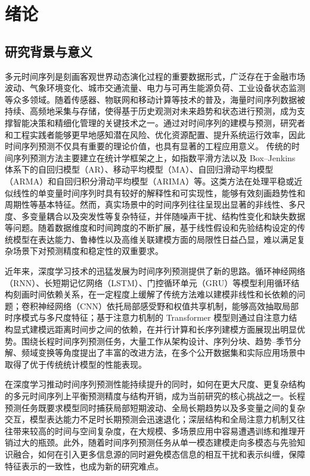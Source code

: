 \chapter{绪论} \section{研究背景与意义} 多元时间序列是刻画客观世界动态演化过程的重要数据形式，广泛存在于金融市场波动、气象环境变化、城市交通流量、电力与可再生能源负荷、工业设备状态监测等众多领域。随着传感器、物联网和移动计算等技术的普及，海量时间序列数据被持续、高频地采集与存储，使得基于历史观测对未来趋势和状态进行预测，成为支撑智能决策和精细化管理的关键技术之一。通过对时间序列的建模与预测，研究者和工程实践者能够更早地感知潜在风险、优化资源配置、提升系统运行效率，因此时间序列预测不仅具有重要的理论价值，也具有显著的工程应用意义\cite{lim2021deep,wen2023transformers}。
传统的时间序列预测方法主要建立在统计学框架之上，如指数平滑方法以及 Box--Jenkins 体系下的自回归模型（AR）、移动平均模型（MA）、自回归滑动平均模型（ARMA）和自回归积分滑动平均模型（ARIMA）等\cite{holt2004forecasting,box2015time}。这类方法在处理平稳或近似线性的单变量时间序列时具有较好的解释性和可实现性，能够有效刻画趋势性和周期性等基本特征。然而，真实场景中的时间序列往往呈现出显著的非线性、多尺度、多变量耦合以及突发性等复杂特征，并伴随噪声干扰、结构性变化和缺失数据等问题。随着数据维度和时间跨度的不断扩展，基于线性假设和先验结构设定的传统模型在表达能力、鲁棒性以及高维关联建模方面的局限性日益凸显，难以满足复杂场景下对预测精度和稳定性的双重要求。

近年来，深度学习技术的迅猛发展为时间序列预测提供了新的思路。循环神经网络（RNN）、长短期记忆网络（LSTM）、门控循环单元（GRU）等模型利用循环结构刻画时间依赖关系，在一定程度上缓解了传统方法难以建模非线性和长依赖的问题\cite{elman1990finding,hochreiter1997lstm}；卷积神经网络（CNN）依托局部感受野和权值共享机制，能够高效抽取局部时序模式与多尺度特征\cite{lecun1998gradient}；基于注意力机制的 Transformer 模型则通过自注意力结构显式建模远距离时间步之间的依赖，在并行计算和长序列建模方面展现出明显优势\cite{vaswani2017attention}。围绕长程时间序列预测任务，大量工作从架构设计、序列分块、趋势--季节分解、频域变换等角度提出了丰富的改进方法，在多个公开数据集和实际应用场景中取得了优于传统统计模型的性能表现\cite{zhou2021informer,wu2021autoformer}。

在深度学习推动时间序列预测性能持续提升的同时，如何在更大尺度、更复杂结构的多元时间序列上平衡预测精度与结构开销，成为当前研究的核心挑战之一。长程预测任务既要求模型同时捕获局部短期波动、全局长期趋势以及多变量之间的复杂交互，模型表达能力不足时长期预测会迅速退化；深层结构和全局注意力机制又往往带来较高的时间与空间复杂度，在大规模、多场景应用中容易遭遇训练和推理开销过大的瓶颈。此外，随着时间序列预测任务从单一模态建模走向多模态与先验知识融合，如何在引入更多信息源的同时避免模态信息的相互干扰和表示纠缠，保障特征表示的一致性，也成为新的研究难点\cite{zeng2023are}。

